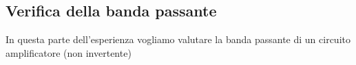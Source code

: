 \subsection{Verifica della banda passante}

In questa parte dell'esperienza vogliamo valutare la banda passante di un circuito amplificatore (non invertente)